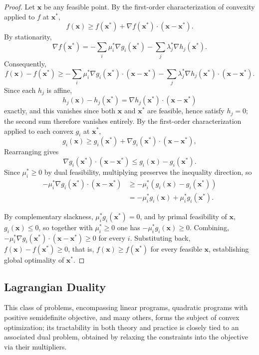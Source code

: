 \begin{proof}
Let $\mathbf{x}$ be any feasible point. By the first-order characterization of convexity applied to $f$ at $\mathbf{x}^*$,
\[
f(\mathbf{x}) \geq f(\mathbf{x}^*) + \nabla f(\mathbf{x}^*)\cdot(\mathbf{x}-\mathbf{x}^*).
\]
By stationarity,
\[
\nabla f(\mathbf{x}^*) = -\sum_i \mu_i^* \nabla g_i(\mathbf{x}^*) - \sum_j \lambda_j^* \nabla h_j(\mathbf{x}^*).
\]
Consequently,
\[
f(\mathbf{x}) - f(\mathbf{x}^*) \geq -\sum_i \mu_i^* \nabla g_i(\mathbf{x}^*)\cdot(\mathbf{x}-\mathbf{x}^*) - \sum_j \lambda_j^* \nabla h_j(\mathbf{x}^*)\cdot(\mathbf{x}-\mathbf{x}^*).
\]
Since each $h_j$ is affine,
\[
h_j(\mathbf{x}) - h_j(\mathbf{x}^*) = \nabla h_j(\mathbf{x}^*)\cdot(\mathbf{x}-\mathbf{x}^*)
\]
 exactly, and this vanishes since both $\mathbf{x}$ and $\mathbf{x}^*$ are feasible, hence satisfy $h_j = 0$; the second sum therefore vanishes entirely. By the first-order characterization applied to each convex $g_i$ at $\mathbf{x}^*$,
\[
g_i(\mathbf{x}) \geq g_i(\mathbf{x}^*) + \nabla g_i(\mathbf{x}^*)\cdot(\mathbf{x}-\mathbf{x}^*),
\]
Rearranging gives
\[
\nabla g_i(\mathbf{x}^*)\cdot(\mathbf{x}-\mathbf{x}^*) \leq g_i(\mathbf{x}) - g_i(\mathbf{x}^*).
\]
Since $\mu_i^* \geq 0$ by dual feasibility, multiplying preserves the inequality direction, so
\[
\begin{aligned}
-\mu_i^*\nabla g_i(\mathbf{x}^*)\cdot(\mathbf{x}-\mathbf{x}^*) &\geq -\mu_i^*(g_i(\mathbf{x})-g_i(\mathbf{x}^*)) \\
&= -\mu_i^* g_i(\mathbf{x}) + \mu_i^*g_i(\mathbf{x}^*).
\end{aligned}
\]

By complementary slackness, $\mu_i^*g_i(\mathbf{x}^*)=0$, and by primal feasibility of $\mathbf{x}$, $g_i(\mathbf{x}) \leq 0$, so together with $\mu_i^* \geq 0$ one has $-\mu_i^*g_i(\mathbf{x}) \geq 0$. Combining, $-\mu_i^*\nabla g_i(\mathbf{x}^*)\cdot(\mathbf{x}-\mathbf{x}^*) \geq 0$ for every $i$. Substituting back, $f(\mathbf{x}) - f(\mathbf{x}^*) \geq 0$, that is, $f(\mathbf{x}) \geq f(\mathbf{x}^*)$ for every feasible $\mathbf{x}$, establishing global optimality of $\mathbf{x}^*$.
\end{proof}



\subsection{Lagrangian Duality}

This class of problems, encompassing linear programs, quadratic programs with positive semidefinite objective, and many others, forms the subject of convex optimization; its tractability in both theory and practice is closely tied to an associated dual problem, obtained by relaxing the constraints into the objective via their multipliers.

